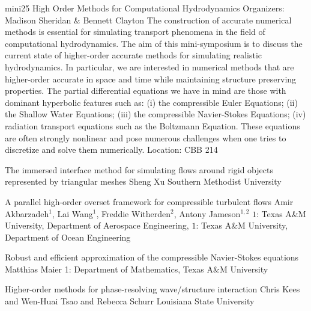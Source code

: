 \mini
{mini25}
{High Order Methods for Computational Hydrodynamics}
{Organizers: Madison Sheridan \& Bennett Clayton}
{The construction of accurate numerical methods is essential for simulating transport phenomena in the field of computational hydrodynamics. The aim of this mini-symposium is to discuss the current state of higher-order accurate methods for simulating realistic hydrodynamics. In particular, we are interested in numerical methods that are higher-order accurate in space and time while maintaining structure preserving properties. The partial differential equations we have in mind are those with dominant hyperbolic features such as: (i) the compressible Euler Equations; (ii) the Shallow Water Equations; (iii) the compressible Navier-Stokes Equations; (iv) radiation transport equations such as the Boltzmann Equation. These equations are often strongly nonlinear and pose numerous challenges when one tries to discretize and solve them numerically.}
{Location: CBB 214}

\begin{talks}
\item\talk
{The immersed interface method for simulating flows around rigid objects represented by triangular meshes}
{Sheng Xu}
{Southern Methodist University}
\item\talk
{A parallel high-order overset framework for compressible turbulent flows}
{Amir Akbarzadeh$^1$, Lai Wang$^1$, Freddie Witherden$^2$, Antony Jameson$^{1,2}$}
{$1$: Texas A\&M University, Department of Aerospace Engineering, $1$: Texas A\&M University, Department of Ocean Engineering}
\item\talk
{Robust and efficient approximation of the compressible Navier-Stokes equations}
{Matthias Maier}
{1: Department of Mathematics, Texas A\&M University}
\item\talk
{Higher-order methods for phase-resolving wave/structure interaction}
{Chris Kees and Wen-Huai Tsao and Rebecca Schurr}
{Louisiana State University}
\end{talks}
\room
